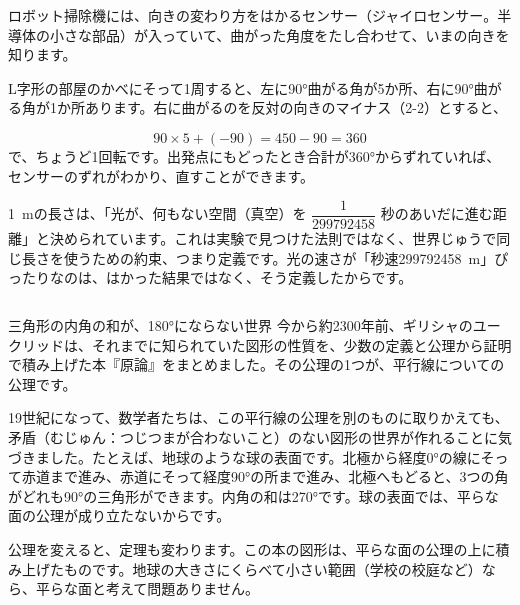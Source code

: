\begin{butsuri}
\par\addvspace{4pt}\noindent\begin{minipage}[c]{0.6\linewidth}
ロボット掃除機には、向きの変わり方をはかるセンサー（ジャイロセンサー。半導体の小さな部品）が入っていて、曲がった角度をたし合わせて、いまの向きを知ります。

L字形の部屋のかべにそって1周すると、左に90°曲がる角が5か所、右に90°曲がる角が1か所あります。右に曲がるのを反対の向きのマイナス（2-2）とすると、
\end{minipage}\hfill
\begin{minipage}[c]{0.37\linewidth}\centering
{}
\end{minipage}
\[ 90\times5+(-90)=450-90=360 \]
で、ちょうど1回転です。出発点にもどったとき合計が360°からずれていれば、センサーのずれがわかり、直すことができます。
\end{butsuri}

\begin{butsuri}
\qty{1}{m}の長さは、「光が、何もない空間（真空）を $\dfrac{1}{\num{299792458}}$ 秒のあいだに進む距離」と決められています。これは実験で見つけた法則ではなく、世界じゅうで同じ長さを使うための約束、つまり定義です。光の速さが「秒速\qty{299792458}{m}」ぴったりなのは、はかった結果ではなく、そう定義したからです。
\end{butsuri}

\begin{column}{三角形の内角の和が、180°にならない世界}
今から約2300年前、ギリシャのユークリッドは、それまでに知られていた図形の性質を、少数の定義と公理から証明で積み上げた本『原論』をまとめました。その公理の1つが、平行線についての公理です。

19世紀になって、数学者たちは、この平行線の公理を別のものに取りかえても、矛盾（むじゅん：つじつまが合わないこと）のない図形の世界が作れることに気づきました。たとえば、地球のような球の表面です。北極から経度0°の線にそって赤道まで進み、赤道にそって経度90°の所まで進み、北極へもどると、3つの角がどれも90°の三角形ができます。内角の和は270°です。球の表面では、平らな面の公理が成り立たないからです。

公理を変えると、定理も変わります。この本の図形は、平らな面の公理の上に積み上げたものです。地球の大きさにくらべて小さい範囲（学校の校庭など）なら、平らな面と考えて問題ありません。
\end{column}

